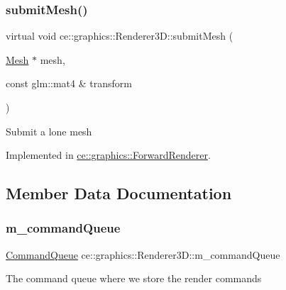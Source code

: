 \subsubsection{\texorpdfstring{submit\+Mesh()}{submitMesh()}}
{\footnotesize\ttfamily virtual void ce\+::graphics\+::\+Renderer3\+D\+::submit\+Mesh (\begin{DoxyParamCaption}\item[{\hyperlink{classce_1_1graphics_1_1_mesh}{Mesh} $\ast$}]{mesh,  }\item[{const glm\+::mat4 \&}]{transform }\end{DoxyParamCaption})\hspace{0.3cm}{\ttfamily [pure virtual]}}

Submit a lone mesh 

Implemented in \hyperlink{classce_1_1graphics_1_1_forward_renderer_abfb5f86e8b5c6a1824ab7a03838785fd}{ce\+::graphics\+::\+Forward\+Renderer}.



\subsection{Member Data Documentation}
\mbox{\label{classce_1_1graphics_1_1_renderer3_d_a495b3dd349daf3e7f7b7b0cc0de8d950}} 
\subsubsection{\texorpdfstring{m\+\_\+command\+Queue}{m\_commandQueue}}
{\footnotesize\ttfamily \hyperlink{_renderer3_d_8h_ac74e86a347f4c5c97dd6ad781c329874}{Command\+Queue} ce\+::graphics\+::\+Renderer3\+D\+::m\+\_\+command\+Queue\hspace{0.3cm}{\ttfamily [protected]}}

The command queue where we store the render commands \mbox{\label{classce_1_1graphics_1_1_renderer3_d_a03b1b45f98919b5468fce308f19fac57}} 
